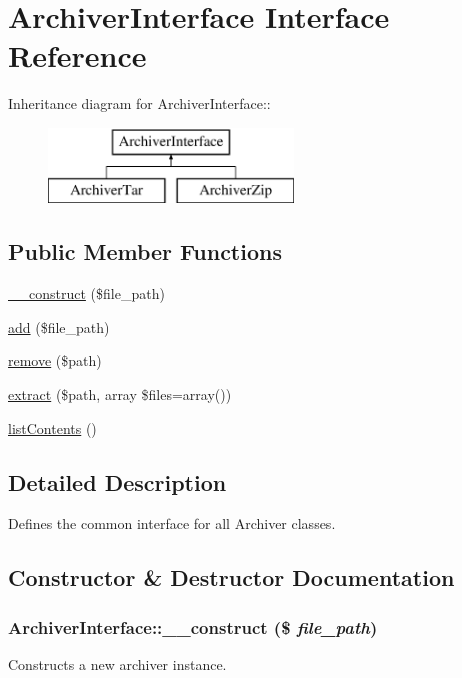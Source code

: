 \hypertarget{interfaceArchiverInterface}{
\section{ArchiverInterface Interface Reference}
\label{interfaceArchiverInterface}
}
Inheritance diagram for ArchiverInterface::\begin{figure}[H]
\begin{center}
\leavevmode
\includegraphics[height=2cm]{interfaceArchiverInterface}
\end{center}
\end{figure}
\subsection*{Public Member Functions}
\begin{DoxyCompactItemize}
\item 
\hyperlink{interfaceArchiverInterface_aa380cf3e1bcf80763ccd6c790b50aee5}{\_\-\_\-construct} (\$file\_\-path)
\item 
\hyperlink{interfaceArchiverInterface_aedd1c39f36b45e2f12381003d83ee4bf}{add} (\$file\_\-path)
\item 
\hyperlink{interfaceArchiverInterface_adf87dd4d31b2af7c9a90617436683edc}{remove} (\$path)
\item 
\hyperlink{interfaceArchiverInterface_a6537e95c432eeedfdc5c72342a40eab2}{extract} (\$path, array \$files=array())
\item 
\hyperlink{interfaceArchiverInterface_a0be527152061af9bfd22a525fc29d78d}{listContents} ()
\end{DoxyCompactItemize}


\subsection{Detailed Description}
Defines the common interface for all Archiver classes. 

\subsection{Constructor \& Destructor Documentation}
\hypertarget{interfaceArchiverInterface_aa380cf3e1bcf80763ccd6c790b50aee5}{
\subsubsection[{\_\-\_\-construct}]{\setlength{\rightskip}{0pt plus 5cm}ArchiverInterface::\_\-\_\-construct (\$ {\em file\_\-path})}}
\label{interfaceArchiverInterface_aa380cf3e1bcf80763ccd6c790b50aee5}
Constructs a new archiver instance.


